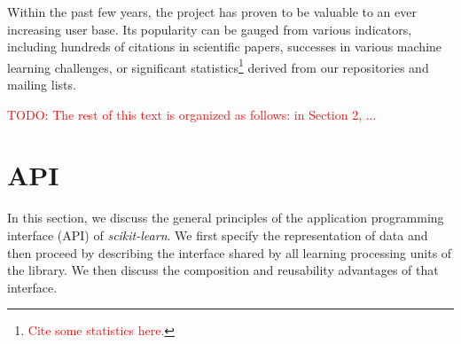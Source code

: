 \documentclass{llncs}
\begin{document}
Within the past few years, the project has proven to be valuable to an  ever
increasing user base. Its popularity can be gauged from various indicators,
including hundreds of citations in scientific papers, successes in various
machine learning challenges, or significant statistics\footnote{\textcolor{red}{Cite some
statistics here.}} derived from our repositories and mailing lists.

\textcolor{red}{TODO: The rest of this text is organized as follows: in Section 2, ...}





\section{API}

In this section, we discuss the general principles of the application programming
interface (API) of \textit{scikit-learn}. We first specify the representation
of data and then proceed by describing the interface shared by all learning
processing units of the library. We then discuss the composition and reusability
advantages of that interface.
\end{document}
